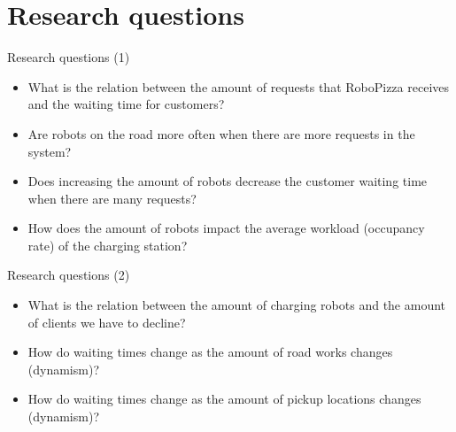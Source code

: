 \section{Research questions}

\begin{frame}{Research questions (1)}
    \begin{itemize}
        \item What is the relation between the amount of requests that RoboPizza receives and the waiting time for customers?
        \item Are robots on the road more often when there are more requests in the system?
        \item Does increasing the amount of robots decrease the customer waiting time when there are many requests?
        \item How does the amount of robots impact the average workload (occupancy rate) of the charging station?
    \end{itemize}
\end{frame}


\begin{frame}{Research questions (2)}
    \begin{itemize}
        \item What is the relation between the amount of charging robots and the amount of clients we have to decline?
        \item How do waiting times change as the amount of road works changes (dynamism)?
        \item How do waiting times change as the amount of pickup locations changes (dynamism)?
    \end{itemize}
\end{frame}
